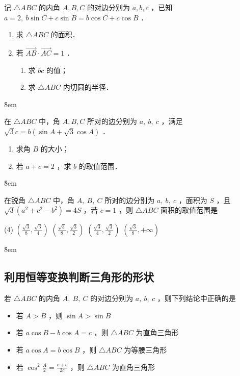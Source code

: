 \begin{example}
    记 $\triangle A B C$ 的内角 $A, B, C$ 的对边分别为 $a, b, c$ ，已知 $a=2, ~ b \sin C+c \sin B=b \cos C+c \cos B$ ．
    \begin{enumerate}
        \item 求 $\triangle A B C$ 的面积．
        \item 若 $\overrightarrow{A B} \cdot \overrightarrow{A C}=1$ ．
              \begin{enumerate}
                  \item 求 $b c$ 的值；
                  \item 求 $\triangle A B C$ 内切圆的半径．
              \end{enumerate}
    \end{enumerate}
\end{example}
\v{8em}

\begin{example}
    在 $\triangle A B C$ 中，角 $A, B, C$ 所对的边分别为 $a, ~ b, ~ c$ ，满足 $\sqrt{3} c=b(\sin A+\sqrt{3} \cos A)$ ．
    \begin{enumerate}
        \item 求角 $B$ 的大小；
        \item 若 $a+c=2$ ，求 $b$ 的取值范围．
    \end{enumerate}
\end{example}
\v{8em}


\begin{example}
    在锐角 $\triangle A B C$ 中，角 $A, ~ B, ~ C$ 所对的边分别为 $a, ~ b, ~ c$ ，面积为 $S$ ，且 $\sqrt{3}\left(a^2+c^2-b^2\right)=4 S$ ，若 $c=1$ ，则 $\triangle A B C$ 面积的取值范围是
    \begin{tasks}(4)
        \task $\left(\frac{\sqrt{3}}{8}, \frac{\sqrt{3}}{4}\right)$
        \task $\left(\frac{\sqrt{3}}{8}, \frac{\sqrt{3}}{2}\right)$
        \task $\left(\frac{\sqrt{3}}{4}, \frac{\sqrt{3}}{2}\right)$
        \task $\left(\frac{\sqrt{3}}{8},+\infty\right)$
    \end{tasks}
\end{example}
\v{8em}

\subsection{利用恒等变换判断三角形的形状}

\begin{example}
    若 $\triangle A B C$ 的内角 $A, ~ B, ~ C$ 的对边分别为 $a, ~ b, ~ c$ ，则下列结论中正确的是
    \begin{itemize}
        \item 若 $A>B$ ，则 $\sin A>\sin B$
        \item 若 $a \cos B-b \cos A=c$ ，则 $\triangle A B C$ 为直角三角形
        \item 若 $a \cos A=b \cos B$ ，则 $\triangle A B C$ 为等腰三角形
        \item 若 $\cos ^2 \frac{A}{2}=\frac{c+b}{2 c}$ ，则 $\triangle A B C$ 为直角三角形
    \end{itemize}
\end{example}

